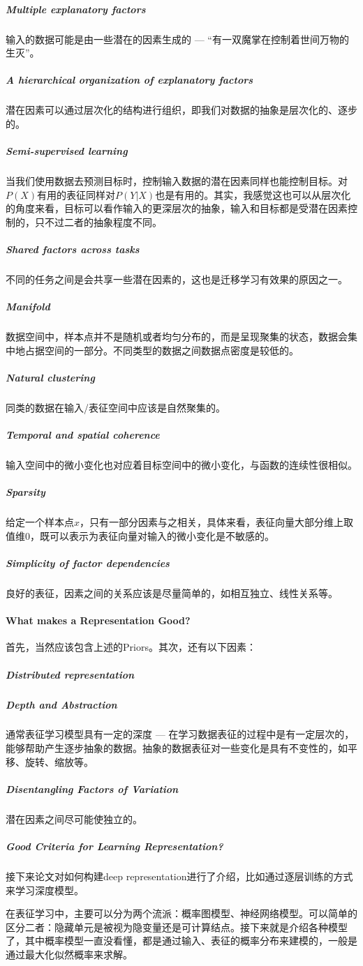 \subparagraph{Multiple explanatory factors}
输入的数据可能是由一些潜在的因素生成的 --- “有一双魔掌在控制着世间万物的生灭”。

\subparagraph{A hierarchical organization of explanatory factors}
潜在因素可以通过层次化的结构进行组织，即我们对数据的抽象是层次化的、逐步的。

\subparagraph{Semi-supervised learning}
当我们使用数据去预测目标时，控制输入数据的潜在因素同样也能控制目标。对$P(X)$有用的表征同样对$P(Y|X)$也是有用的。其实，我感觉这也可以从层次化的角度来看，目标可以看作输入的更深层次的抽象，输入和目标都是受潜在因素控制的，只不过二者的抽象程度不同。

\subparagraph{Shared factors across tasks}
不同的任务之间是会共享一些潜在因素的，这也是迁移学习有效果的原因之一。

\subparagraph{Manifold}
数据空间中，样本点并不是随机或者均匀分布的，而是呈现聚集的状态，数据会集中地占据空间的一部分。不同类型的数据之间数据点密度是较低的。

\subparagraph{Natural clustering}
同类的数据在输入/表征空间中应该是自然聚集的。

\subparagraph{Temporal and spatial coherence}
输入空间中的微小变化也对应着目标空间中的微小变化，与函数的连续性很相似。

\subparagraph{Sparsity}
给定一个样本点$x$，只有一部分因素与之相关，具体来看，表征向量大部分维上取值维0，既可以表示为表征向量对输入的微小变化是不敏感的。

\subparagraph{Simplicity of factor dependencies}
良好的表征，因素之间的关系应该是尽量简单的，如相互独立、线性关系等。

\paragraph{What makes a Representation Good?}
首先，当然应该包含上述的Priors。其次，还有以下因素：
\subparagraph{Distributed representation}
\subparagraph{Depth and Abstraction}
通常表征学习模型具有一定的深度 --- 在学习数据表征的过程中是有一定层次的，能够帮助产生逐步抽象的数据。抽象的数据表征对一些变化是具有不变性的，如平移、旋转、缩放等。

\subparagraph{Disentangling Factors of Variation}
潜在因素之间尽可能使独立的。

\subparagraph{Good Criteria for  Learning Representation?}

接下来论文对如何构建deep representation进行了介绍，比如通过逐层训练的方式来学习深度模型。

在表征学习中，主要可以分为两个流派：概率图模型、神经网络模型。可以简单的区分二者：隐藏单元是被视为隐变量还是可计算结点。接下来就是介绍各种模型了，其中概率模型一直没看懂，都是通过输入、表征的概率分布来建模的，一般是通过最大化似然概率来求解。

